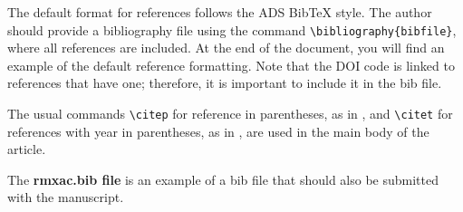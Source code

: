 \documentclass[10pt,letter,twoside]{rmaa-rho-class/rmac-rho}
\newcommand{\CS}[1]{\texttt{\textbackslash #1}}
\begin{document}
    The default format for references follows the ADS BibTeX style. The author should provide a bibliography file using the command \CS{bibliography}\verb|{bibfile}|, where all references are included. At the end of the document, you will find an example of the default reference formatting. Note that the DOI code is linked to references that have one; therefore, it is important to include it in the bib file.
    
    The usual commands \CS{citep} for reference in parentheses, as in \citep{Roman23},  and \CS{citet} for references with year in parentheses, as in \citet{Roman23}, are used in the main body of the article.   
    
The {\bf rmxac.bib file} is an example of a bib file that should also be submitted with the manuscript.




\end{document}
